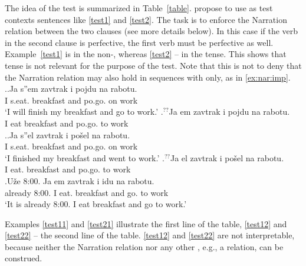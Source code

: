The idea of the test is summarized in Table~\ref{table}. \citet{ZinovaFilip:13} propose to use as test contexts sentences like \ref{test1} and \ref{test2}. The task is to enforce the Narration relation  between the two clauses (see more details below). In this case if the verb in the second clause is perfective, the first verb must be perfective as well. Example~\ref{test1} is in the non-, whereas \ref{test2} -- in the  tense. This shows that tense is not relevant for the purpose of the test. Note that this is not to deny that the Narration relation may also hold in sequences with  only, as in \ref{ex:nar:imp}.
\ex.\label{test1}\ag.\label{test11}Ja s''em\textsuperscript{\PF} zavtrak i pojdu\textsuperscript{\PF} na rabotu.\\
I s.eat. breakfast and po.go. on work\\
\trans `I will finish my breakfast and go to work.'
\bg.\label{test12}$^{??}$Ja em\textsuperscript{\IPF} zavtrak i pojdu\textsuperscript{\PF} na rabotu.\\ 
I eat breakfast and po.go. to work\\

\ex.\label{test2}\ag.\label{test21}Ja s''el\textsuperscript{\PF} zavtrak i po\v{s}el\textsuperscript{\PF} na rabotu.\\
I s.eat. breakfast and po.go. on work\\
\trans `I finished my breakfast and went to work.'
\bg.\label{test22}$^{??}$Ja el\textsuperscript{\IPF} zavtrak i po\v{s}el\textsuperscript{\PF} na rabotu.\\
I eat. breakfast and po.go. to work\\

\exg.\label{ex:nar:imp}U\v{z}e 8:00. Ja em\textsuperscript{\IPF} zavtrak i idu\textsuperscript{\IPF} na rabotu.\\
already 8:00. I eat. breakfast and go. to work\\
\trans `It is already 8:00. I eat breakfast and go to work.'

Examples \ref{test11} and \ref{test21} illustrate the first line of the table, \ref{test12} and \ref{test22} -- the second line of the table. \ref{test12} and \ref{test22} are not interpretable, because neither the Narration relation nor any other , e.g., a  relation, can be construed. 

